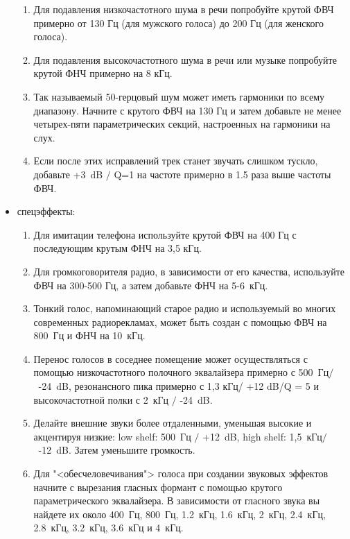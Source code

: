 \documentclass[oneside, final, 14pt]{extreport}
\begin{document}
\begin{itemize}
\begin{enumerate}
    \item Для подавления низкочастотного шума в речи попробуйте крутой ФВЧ примерно от 130 Гц (для мужского голоса) до 200 Гц (для женского голоса).
    \item Для подавления высокочастотного шума в речи или музыке попробуйте крутой ФНЧ примерно на 8 кГц.
    \item Так называемый 50-герцовый шум может иметь гармоники по всему диапазону. Начните с крутого ФВЧ на 130 Гц и затем добавьте не менее четырех-пяти параметрических секций, настроенных на гармоники на слух.
    \item Если после этих исправлений трек станет звучать слишком тускло, добавьте +3~dB $/$ Q=1 на частоте примерно в 1.5 раза выше частоты ФВЧ.
  \end{enumerate}
  \item спецэффекты:
  \begin{enumerate}
    \item Для имитации телефона используйте крутой ФВЧ на 400 Гц с последующим крутым ФНЧ на 3,5 кГц.
    \item Для громкоговорителя радио, в зависимости от его качества, используйте ФВЧ на 300-500 Гц, а затем добавьте ФНЧ на 5-6~кГц.
    \item Тонкий голос, напоминающий старое радио и используемый во многих современных радиорекламах, может быть создан с помощью ФВЧ на 800~Гц и ФНЧ на 10~кГц.
    \item Перенос голосов в соседнее помещение может осуществляться с помощью низкочастотного полочного эквалайзера примерно с 500~Гц$/$~-24~dB, резонансного пика примерно с 1,3 кГц/ +12 dB/Q = 5 и высокочастотной полки с 2~кГц $/$ -24~dB.
    \item Делайте внешние звуки более отдаленными, уменьшая высокие и акцентируя низкие: low shelf: 500~Гц $/$ +12~dB, high shelf: 1,5~кГц$/$~-12~dB. Затем уменьшите громкость.
    \item Для "<обесчеловечивания"> голоса при создании звуковых эффектов начните с вырезания гласных формант с помощью крутого параметрического эквалайзера. В зависимости от гласного звука вы найдете их около 400~Гц, 800~Гц, 1.2~кГц, 1.6~кГц, 2~кГц, 2.4~кГц, 2.8~кГц, 3.2~кГц, 3.6~кГц и 4~кГц.
  \end{enumerate}
\end{itemize}
\end{document}
